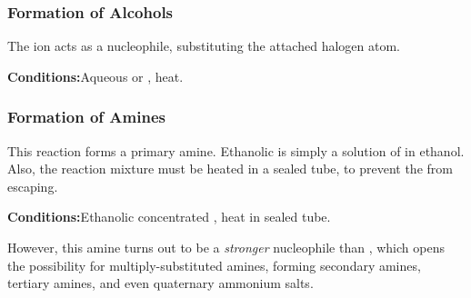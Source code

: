 			\pagebreak
			\subsubsection{Formation of Alcohols}

				The  ion acts as a nucleophile, substituting the attached halogen atom.

				\vspace{1.5em}
				\vbox{\textbf{Conditions:}\tabto{35mm}Aqueous  or , heat.}

				\diagram[1.0]{
					\schemestart[0,1.5,thick]
						\chemfig{!\molR-[:0]!\molX}
						\hspace{2mm} + \hspace{2mm}
						\chemfig{!\molOH\mch}
						\arrow
						\chemfig{!\molR-[:0]!\molOH}
						\hspace{2mm} + \hspace{2mm}
						\chemfig{!\molX\mch}
					\schemestop
				}


			\subsubsection{Formation of Amines}

				This reaction forms a primary amine. Ethanolic  is simply a solution of  in ethanol. Also, the reaction
				mixture must be heated in a sealed tube, to prevent the  from escaping.

				\vspace{1.5em}
				\vbox{\textbf{Conditions:}\tabto{35mm}Ethanolic concentrated , heat in sealed tube.}



				However, this amine turns out to be a \textit{stronger} nucleophile than ,
				which opens the possibility for multiply-substituted amines, forming secondary amines, tertiary amines, and even
				quaternary ammonium salts.


